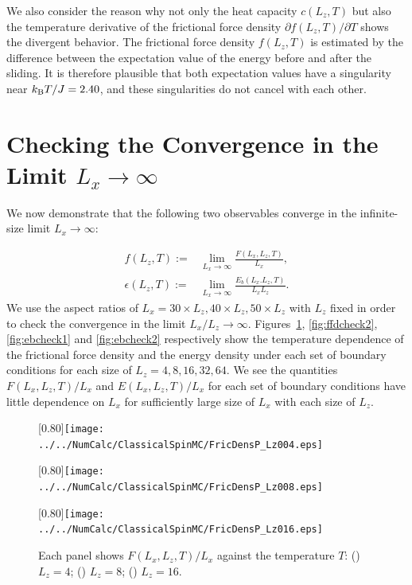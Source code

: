 
We also consider the reason why not only the heat capacity $c(L_{z}, T)$ but also the temperature derivative of the frictional force density $\partial f(L_{z}, T)/\partial T$ shows the divergent behavior. The frictional force density $f(L_{z}, T)$ is estimated by the difference between the expectation value of the energy before and after the sliding. It is therefore plausible that both expectation values have a singularity near $k_{\rm B}T/J=2.40$, and these singularities do not cancel with each other.

\section{Checking the Convergence in the Limit $L_{x}\to\infty$}
\label{sec:convcheck}

We now demonstrate that the following two observables converge in the infinite-size limit $L_{x}\to\infty$:

\begin{align}
f(L_{z}, T):=&\lim_{L_{x}\to\infty}\frac{F(L_{x}, L_{z}, T)}{L_{x}},\\
\epsilon(L_{z}, T):=&\lim_{L_{x}\to\infty}\frac{E_{b}(L_{x}. L_{z}, T)}{L_{x}L_{z}}.
\end{align}
We use the aspect ratios of $L_{x}=30\times L_{z}, 40\times L_{z}, 50\times L_{z}$ with $L_{z}$ fixed in order to check the convergence in the limit $L_{x}/L_{z}\to\infty$. Figures~\ref{fig:ffdcheck1}, \ref{fig:ffdcheck2}, \ref{fig:ebcheck1} and \ref{fig:ebcheck2} respectively show the temperature dependence of the frictional force density and the energy density under each set of boundary conditions for each size of $L_{z} = 4, 8, 16, 32, 64$. We see the quantities $F(L_{x}, L_{z}, T)/L_{x}$ and $E(L_{x}, L_{z}, T)/L_{x}$ for each set of boundary conditions have little dependence on $L_{x}$ for sufficiently large size of $L_{x}$ with each size of $L_{z}$.

\begin{figure}[htbp]
	\centering
	\subcaptionbox{\label{fig:ffdcheckfor004}}[0.80\linewidth]{\texttt{[image: ../../NumCalc/ClassicalSpinMC/FricDensP\_Lz004.eps]}}
	
	\subcaptionbox{\label{fig:ffdcheckfor008}}[0.80\linewidth]{\texttt{[image: ../../NumCalc/ClassicalSpinMC/FricDensP\_Lz008.eps]}}
	
	\subcaptionbox{\label{fig:ffdcheckfor016}}[0.80\linewidth]{\texttt{[image: ../../NumCalc/ClassicalSpinMC/FricDensP\_Lz016.eps]}}
	
	\caption{Each panel shows $F(L_{x}, L_{z}, T)/L_{x}$ against the temperature $T$: () $L_{z}=4$; () $L_{z}=8$; () $L_{z}=16$.}
	\label{fig:ffdcheck1}
\end{figure}

